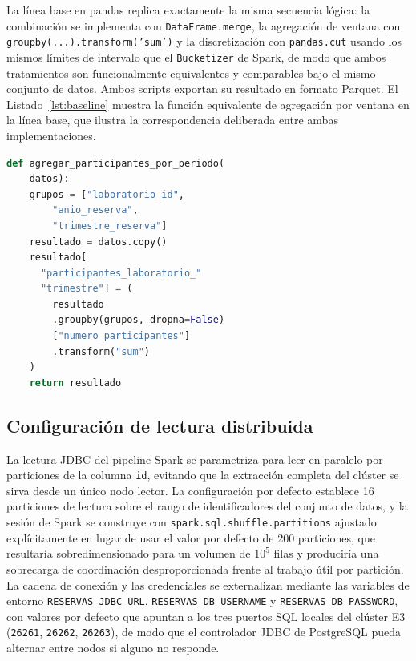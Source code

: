 \documentclass[10pt,twocolumn]{article}
\begin{document}
La línea base en pandas replica exactamente la misma secuencia lógica: la
combinación se implementa con \texttt{DataFrame.merge}, la agregación de
ventana con \texttt{groupby(...).transform('sum')} y la discretización con
\texttt{pandas.cut} usando los mismos límites de intervalo que el
\texttt{Bucketizer} de Spark, de modo que ambos tratamientos son
funcionalmente equivalentes y comparables bajo el mismo conjunto de datos.
Ambos scripts exportan su resultado en formato Parquet. El
Listado~\ref{lst:baseline} muestra la función equivalente de agregación por
ventana en la línea base, que ilustra la correspondencia deliberada entre
ambas implementaciones.

\begin{lstlisting}[language=Python,caption={Agregación por ventana equivalente en la línea base pandas (\texttt{spark/baseline.py}).},label={lst:baseline}]
def agregar_participantes_por_periodo(
    datos):
    grupos = ["laboratorio_id",
        "anio_reserva",
        "trimestre_reserva"]
    resultado = datos.copy()
    resultado[
      "participantes_laboratorio_"
      "trimestre"] = (
        resultado
        .groupby(grupos, dropna=False)
        ["numero_participantes"]
        .transform("sum")
    )
    return resultado
\end{lstlisting}

\subsection{Configuración de lectura distribuida}

La lectura JDBC del pipeline Spark se parametriza para leer en paralelo por
particiones de la columna \texttt{id}, evitando que la extracción completa
del clúster se sirva desde un único nodo lector. La configuración por
defecto establece 16 particiones de lectura sobre el rango de
identificadores del conjunto de datos, y la sesión de Spark se construye
con \texttt{spark.sql.shuffle.partitions} ajustado explícitamente en lugar
de usar el valor por defecto de 200 particiones, que resultaría
sobredimensionado para un volumen de $10^5$ filas y produciría una sobrecarga
de coordinación desproporcionada frente al trabajo útil por partición. La
cadena de conexión y las credenciales se externalizan mediante las
variables de entorno \texttt{RESERVAS\_JDBC\_URL},
\texttt{RESERVAS\_DB\_USERNAME} y \texttt{RESERVAS\_DB\_PASSWORD}, con
valores por defecto que apuntan a los tres puertos SQL locales del clúster
E3 (\texttt{26261}, \texttt{26262}, \texttt{26263}), de modo que el
controlador JDBC de PostgreSQL pueda alternar entre nodos si alguno no
responde.
\end{document}
